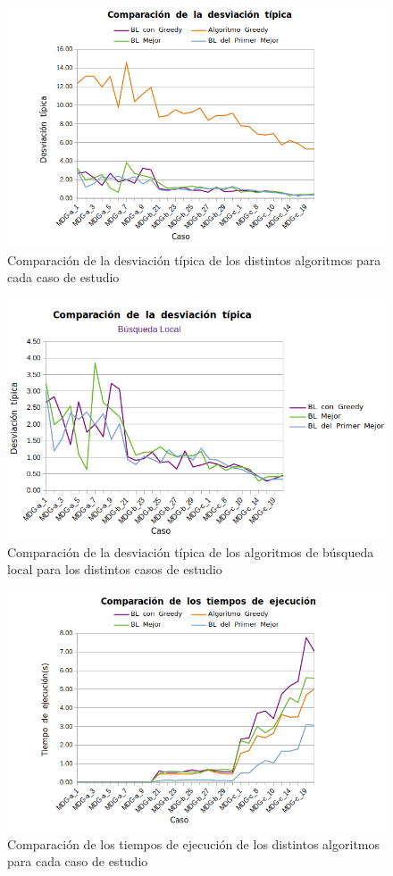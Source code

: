 \documentclass[11pt,a4paper]{article}
\begin{document}
\begin{figure}[H]
	\centering
	\includegraphics[width=0.9\linewidth]{img/comp_dev}
	\caption{Comparación de la desviación típica de los distintos algoritmos para cada caso de estudio}
	\label{fig:compdev}
\end{figure}

\begin{figure}[H]
	\centering
	\includegraphics[width=0.9\linewidth]{img/comp_dev_bl}
	\caption{Comparación de la desviación típica de los algoritmos de búsqueda local para los distintos casos de estudio}
	\label{fig:compdevbl}
\end{figure}

\begin{figure}[H]
	\centering
	\includegraphics[width=0.9\linewidth]{img/comp_tiempo}
	\caption{Comparación de los tiempos de ejecución de los distintos algoritmos para cada caso de estudio}
	\label{fig:comptiempo}
\end{figure}
\end{document}
